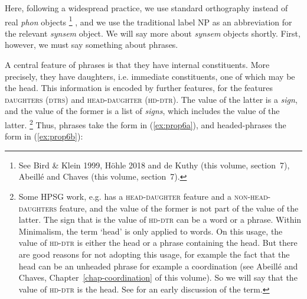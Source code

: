 \documentclass[output=paper
	        ,collection
	        ,collectionchapter
 	        ,biblatex
                ,babelshorthands
                ,newtxmath
                ,draftmode
                ,colorlinks, citecolor=brown
]{langscibook}
\begin{document}
\ea\label{ex:prop5}
\z


Here, following a widespread practice, we use standard orthography instead of real \emph{phon} objects%
%
\footnote{See Bird \& Klein 1999, Höhle 2018%
	and de Kuthy (this volume, section~7), Abeillé and Chaves (this volume, section~7).}%
%
, and we use the traditional label NP as an abbreviation for the relevant \emph{synsem} object. We will say more about \emph{synsem} objects shortly. First, however, we must say something about phrases.

A central feature of phrases is that they have internal constituents. More precisely, they have daughters, i.e. immediate constituents, one of which may be the head. This information is encoded by further features, for \citet[29]{GSag2000a-u} the features \textsc{daughters} (\textsc{dtrs}) and \textsc{head-daughter} (\textsc{hd-dtr}). The value of the latter is a \emph{sign}, and the value of the former is a list of \emph{signs}, which includes the value of the latter.%
%
\footnote{Some HPSG work, e.g. \citet{Sag97a} has a \textsc{head-daughter} feature and a \textsc{non-head-daughters} feature, and the value of the former is not part of the value of the latter. The sign that is the value of \textsc{hd-dtr} can be a word or a phrase. Within Minimalism, the term ‘head’ is only applied to words. On this usage, the value of \textsc{hd-dtr} is either the head or a phrase containing the head. But there are good reasons for not adopting this usage, for example the fact that the head can be an unheaded phrase for example a coordination (see Abeillé and Chaves,  Chapter~\ref{chap-coordination} of this volume). So we will say that the value of \textsc{hd-dtr} is the head. See \citet[30]{Jackendoff77a} for an early discussion of the term.}
%
{\color{red}
Thus, phrases take the form in (\ref{ex:prop6a}), and headed-phrases the form in (\ref{ex:prop6b}):
}

\begin{multicols}{2}
\ea\label{ex:prop6}
	\ea\label{ex:prop6a}

\columnbreak
	
	\ex\label{ex:prop6b}
	\z
\z
\end{multicols}
\end{document}
